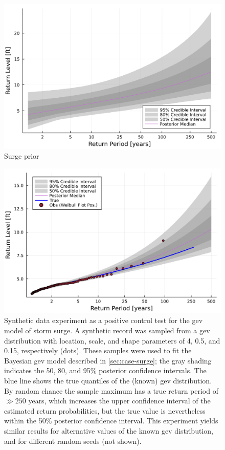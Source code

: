 \documentclass[11pt]{article}
\begin{document}
\begin{figure}
    \centering
    \includegraphics[width=\textwidth]{surge-prior-return}
    \caption{
        Surge prior
    }\label{fig:surge-prior-return}
\end{figure}

\begin{figure}
    \centering
    \includegraphics[width=\textwidth]{surge-synthetic-data-experiment}
    \caption{
        Synthetic data experiment as a positive control test for the \gls{gev} model of storm surge.
        A synthetic record was sampled from a \gls{gev} distribution with location, scale, and shape parameters of 4, 0.5, and 0.15, respectively (dots).
        These samples were used to fit the Bayesian \gls{gev} model described in \cref{sec:case-surge}; the gray shading indicates the 50, 80, and 95\% posterior confidence intervals.
        The blue line shows the true quantiles of the (known) \gls{gev} distribution.
        By random chance the sample maximum has a true return period of $\gg 250$ years, which increases the upper confidence interval of the estimated return probabilities, but the true value is nevertheless within the 50\% posterior confidence interval.
        This experiment yields similar results for alternative values of the known \gls{gev} distribution, and for different random seeds (not shown).
    }\label{fig:surge-synthetic-data-experiment}
\end{figure}
\end{document}
